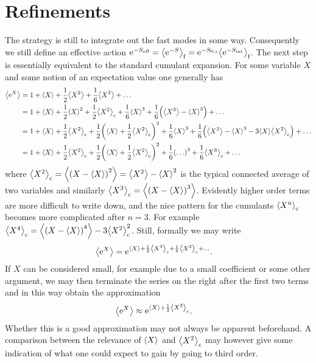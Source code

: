 \documentclass[english, parskip=full]{scrartcl}
\begin{document}
\section{Refinements}
The strategy is still to integrate out the fast modes in some way.
Consequently we still define an effective action $\powe{-S_\text{eff}} = \bra*{\powe{-S}}_\f = \powe{-S_{0,\s}} \bra*{\powe{-S_\text{int}}}_\f$.
The next step is essentially equivalent to the standard cumulant expansion.
For some variable $X$ and some notion of an expectation value one generally has
\begin{align}
\bra*{\powe{X}} &= 1 + \bra*{X} + \frac{1}{2} \bra*{X^2} + \frac{1}{6} \bra*{X^3} + \dots \\
&= 1 + \bra*{X} + \frac{1}{2} \bra*{X}^2 + \frac{1}{2} \bra*{X^2}_\c + \frac{1}{6} \bra*{X}^3 + \frac{1}{6} \kla*{\bra*{X^3} - \bra*{X}^3} + \dots\\
&= 1 + \bra*{X} + \frac{1}{2} \bra*{X^2}_\c + \frac{1}{2} \kla*{\bra*{X} + \frac{1}{2} \bra*{X^2}_\c}^2 + \frac{1}{6} \bra*{X}^3 + \frac{1}{6} \kla*{\bra*{X^3} - \bra*{X}^3 - 3\bra*{X} \bra*{X^2}_\c} + \dots\\
&= 1 + \bra*{X} + \frac{1}{2} \bra*{X^2}_\c + \frac{1}{2} \kla*{\bra*{X} + \frac{1}{2}\bra*{X^2}_\c}^2 + \frac{1}{6}\kla*{\dots}^3 + \frac{1}{6} \bra*{X^3}_\c + \dots
\end{align}
where $\bra*{X^2}_\c = \bra*{\kla*{X - \bra*{X}}^2} = \bra*{X^2} - \bra*{X}^2$ is the typical connected average of two variables and similarly $\bra*{X^3}_\c = \bra*{\kla*{X - \bra*{X}}^3}$.
Evidently higher order terms are more difficult to write down, and the nice pattern for the cumulants $\bra*{X^n}_\c$ becomes more complicated after $n=3$.
For example $\bra*{X^4}_\c = \bra*{\kla*{X - \bra*{X}}^4} - 3 \bra*{X^2}_\c^2$.
Still, formally we may write
\begin{align}
\bra*{\powe{X}} &= \powe{\bra*{X} + \frac{1}{2}\bra*{X^2}_\c + \frac{1}{6} \bra*{X^3}_\c + \dots}.
\end{align}
If $X$ can be considered small, for example due to a small coefficient or some other argument, we may then terminate the series on the right after the first two terms and in this way obtain the approximation
\begin{align}
\bra*{\powe{X}} &\approx \powe{\bra*{X} + \frac{1}{2} \bra*{X^2}_\c}.
\end{align}
Whether this is a good approximation may not always be apparent beforehand.
A comparison between the relevance of $\bra*{X}$ and $\bra*{X^2}_\c$ may however give some indication of what one could expect to gain by going to third order.\\
\end{document}
